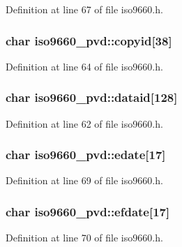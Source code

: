 Definition at line 67 of file iso9660.\+h.

\hypertarget{structiso9660__pvd_ac823631d979880abef81ce27b040eb52}{
\subsubsection[{copyid}]{\setlength{\rightskip}{0pt plus 5cm}char iso9660\+\_\+pvd\+::copyid\mbox{[}38\mbox{]}}}\label{structiso9660__pvd_ac823631d979880abef81ce27b040eb52}


Definition at line 64 of file iso9660.\+h.

\hypertarget{structiso9660__pvd_a0a29d27dbc0e5697c5d792402b0b997a}{
\subsubsection[{dataid}]{\setlength{\rightskip}{0pt plus 5cm}char iso9660\+\_\+pvd\+::dataid\mbox{[}128\mbox{]}}}\label{structiso9660__pvd_a0a29d27dbc0e5697c5d792402b0b997a}


Definition at line 62 of file iso9660.\+h.

\hypertarget{structiso9660__pvd_ae6918d87e2f0b5c3ee804109f3231345}{
\subsubsection[{edate}]{\setlength{\rightskip}{0pt plus 5cm}char iso9660\+\_\+pvd\+::edate\mbox{[}17\mbox{]}}}\label{structiso9660__pvd_ae6918d87e2f0b5c3ee804109f3231345}


Definition at line 69 of file iso9660.\+h.

\hypertarget{structiso9660__pvd_a28b756e60f3c81ddff6f6a218541e4b3}{
\subsubsection[{efdate}]{\setlength{\rightskip}{0pt plus 5cm}char iso9660\+\_\+pvd\+::efdate\mbox{[}17\mbox{]}}}\label{structiso9660__pvd_a28b756e60f3c81ddff6f6a218541e4b3}


Definition at line 70 of file iso9660.\+h.

